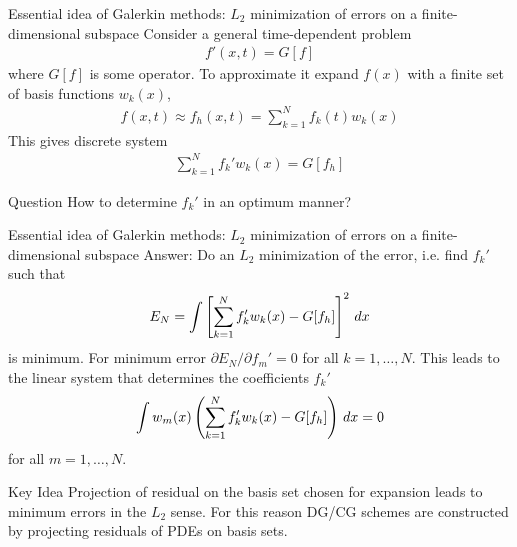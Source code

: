 \documentclass[pdf]{beamer}
\newcommand{\mypause}{}
\theoremstyle{definition}
\begin{document}
\begin{frame}{Essential idea of Galerkin methods: $L_2$ minimization
    of errors on a finite-dimensional subspace}
  \small
  Consider a general time-dependent problem
  \begin{align*}
    f'(x,t) = G[f]
  \end{align*}
  where $G[f]$ is some operator. To approximate it expand $f(x)$ with
  a finite set of basis functions $w_k(x)$,
  \begin{align*}
    f(x,t) \approx f_h(x,t)  = \sum_{k=1}^N f_k(t) w_k(x)
  \end{align*}
  This gives discrete system
  \begin{align*}
    \sum_{k=1}^N f_k' w_k(x) = G[f_h]
  \end{align*}
  \mypause
  \begin{block}{Question}
    How to determine $f_k'$ in an optimum manner?
  \end{block}
  
\end{frame}

\begin{frame}{Essential idea of Galerkin methods: $L_2$ minimization
    of errors on a finite-dimensional subspace}
  \small
  Answer: Do an $L_2$ minimization of the error, i.e. find $f_k'$ such
  that
  \begin{align*}
    E_N = \int \left[
      \sum_{k=1}^N f_k' w_k(x) - G[f_h]\right]^2\thinspace dx
  \end{align*}
  is minimum. For minimum error $\partial E_N/\partial f_m' = 0$ for
  all $k=1,\ldots,N$. This leads to the linear system that determines
  the coefficients $f_k'$
  \begin{align*}
    \int w_m(x) \left(
      \sum_{k=1}^N f_k' w_k(x) - G[f_h]
    \right)\thinspace dx = 0
  \end{align*}
  for all $m=1,\ldots,N$.
  \mypause
  \begin{block}{Key Idea}
    Projection of residual on the basis set chosen for expansion leads
    to minimum errors in the $L_2$ sense. For this reason DG/CG
    schemes are constructed by projecting residuals of PDEs on basis
    sets.
  \end{block}

\end{frame}
\end{document}
